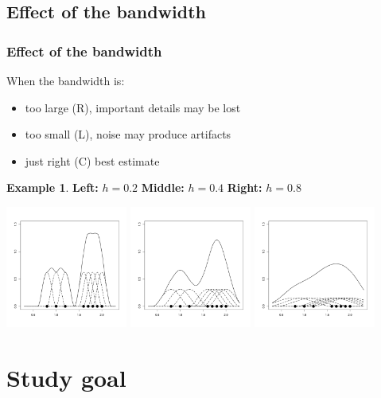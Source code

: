 \documentclass[notheorems]{beamer}
\theoremstyle{definition}
\theoremstyle{example}
\newtheorem{example}{Example}
\begin{document}
\subsection{Effect of the bandwidth}
\begin{frame}\frametitle{Effect of the bandwidth}
    When the bandwidth is:
    \begin{itemize}
        \item too large (R), important details may be lost
        \item too small (L), noise may produce artifacts
        \item just right (C) best estimate
    \end{itemize}
    \begin{example}{\tiny{\textbf{Left:} $h=0.2$ \textbf{Middle:} $h=0.4$ \textbf{Right:} $h=0.8$ }}
    \centerline{
        \label{fig:points-and-dkd}
        \centering
        \includegraphics[width=0.3\textwidth]{kernel1d-02}
        \includegraphics[width=0.3\textwidth]{kernel1d-04}
        \includegraphics[width=0.3\textwidth]{kernel1d-08}
    }
    \end{example}
\end{frame}



\section{Study goal}
\end{document}
